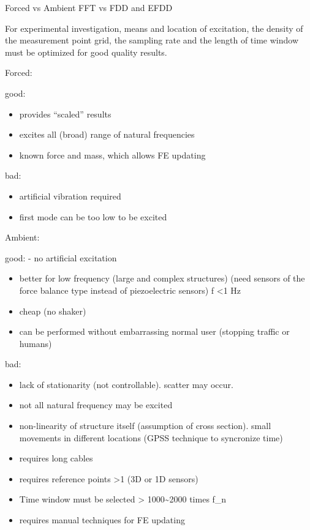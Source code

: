 \documentclass[
  letterpaper,
  DIV=11,
  numbers=noendperiod]{scrreprt}
\begin{document}
Forced vs Ambient FFT vs FDD and EFDD

For experimental investigation, means and location of excitation, the
density of the measurement point grid, the sampling rate and the length
of time window must be optimized for good quality results.

Forced:

good:

\begin{itemize}
\item
  provides ``scaled'' results
\item
  excites all (broad) range of natural frequencies
\item
  known force and mass, which allows FE updating
\end{itemize}

bad:

\begin{itemize}
\item
  artificial vibration required
\item
  first mode can be too low to be excited
\end{itemize}

Ambient:

good: - no artificial excitation

\begin{itemize}
\item
  better for low frequency (large and complex structures) (need sensors
  of the force balance type instead of piezoelectric sensors) f
  \textless1 Hz
\item
  cheap (no shaker)
\item
  can be performed without embarrassing normal user (stopping traffic or
  humans)
\end{itemize}

bad:

\begin{itemize}
\item
  lack of stationarity (not controllable). scatter may occur.
\item
  not all natural frequency may be excited
\item
  non-linearity of structure itself (assumption of cross section). small
  movements in different locations (GPSS technique to syncronize time)
\item
  requires long cables
\item
  requires reference points \textgreater1 (3D or 1D sensors)
\item
  Time window must be selected \textgreater{} 1000\textasciitilde2000
  times f\_n
\item
  requires manual techniques for FE updating
\end{itemize}
\end{document}

